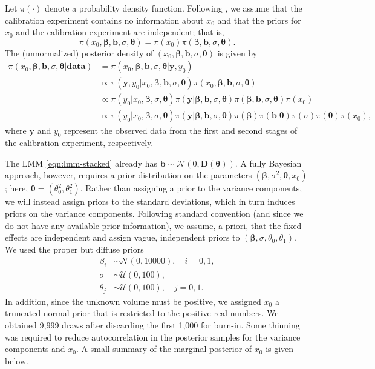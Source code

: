 \documentclass{article}\usepackage[]{graphicx}\usepackage[]{color}
\begin{document}
Let $\pi(\cdot)$ denote a probability density function.  Following \citet{hoadley-bayesian-1970}, we assume that the calibration experiment contains no information about $x_0$ and that the priors for $x_0$ and the calibration experiment are independent; that is,
\begin{equation*}
  \pi(x_0, \bm{\beta}, \bm{b}, \sigma, \bm{\theta}) = \pi(x_0)\pi(\bm{\beta}, \bm{b}, \sigma, \bm{\theta}).
\end{equation*}
The (unnormalized) posterior density of $(x_0, \bm{\beta}, \bm{b}, \sigma, \bm{\theta})$ is given by
\begin{align*}
  \pi(x_0, \bm{\beta}, \bm{b}, \sigma, \bm{\theta} | \mathbf{data}) &= \pi(x_0, \bm{\beta}, \bm{b}, \sigma, \bm{\theta} | \bm{y}, y_0) \\
  &\propto \pi(\bm{y}, y_0 | x_0, \bm{\beta}, \bm{b}, \sigma, \bm{\theta})\pi(x_0, \bm{\beta}, \bm{b}, \sigma, \bm{\theta}) \\
  &\propto \pi(y_0 | x_0, \bm{\beta}, \sigma, \bm{\theta})\pi(\bm{y} | \bm{\beta}, \bm{b}, \sigma, \bm{\theta})\pi(\bm{\beta}, \bm{b}, \sigma, \bm{\theta})\pi(x_0) \\
  &\propto \pi(y_0 | x_0, \bm{\beta}, \sigma, \bm{\theta})\pi(\bm{y} | \bm{\beta}, \bm{b}, \sigma, \bm{\theta})\pi(\bm{\beta})\pi(\bm{b}|\bm{\theta})\pi(\sigma)\pi(\bm{\theta})\pi(x_0),
\end{align*}
where $\bm{y}$ and $y_0$ represent the observed data from the first and second stages of the calibration experiment, respectively.

The LMM \eqref{eqn:lmm-stacked} already has $\bm{b} \sim \mathcal{N}\left(0, \bm{D}\left(\bm{\theta}\right)\right)$.  A fully Bayesian approach, however, requires a prior distribution on the parameters $(\bm{\beta}, \sigma^2, \bm{\theta}, x_0)$; here, $\bm{\theta} = \left(\theta_0^2, \theta_1^2\right)$.  Rather than assigning a prior to the variance components, we will instead assign priors to the standard deviations, which in turn induces priors on the variance components.  Following standard convention (and since we do not have any available prior information), we assume, a priori, that the fixed-effects are independent and assign vague, independent priors to $\left(\bm{\beta}, \sigma, \theta_0, \theta_1\right)$.  We used the proper but diffuse priors
\begin{align*}
  \beta_i &\sim \mathcal{N}\left(0, 10000\right), \quad i = 0, 1, \\
  \sigma &\sim \mathcal{U}\left(0, 100\right), \\
  \theta_j &\sim \mathcal{U}\left(0, 100\right), \quad j = 0, 1.
\end{align*}
In addition, since the unknown volume must be positive, we assigned $x_0$ a truncated normal prior that is restricted to the positive real numbers.  We obtained 9,999 draws after discarding the first 1,000 for burn-in.  Some thinning was required to reduce autocorrelation in the posterior samples for the variance components and $x_0$.  A small summary of the marginal posterior of $x_0$ is given below.
\end{document}
